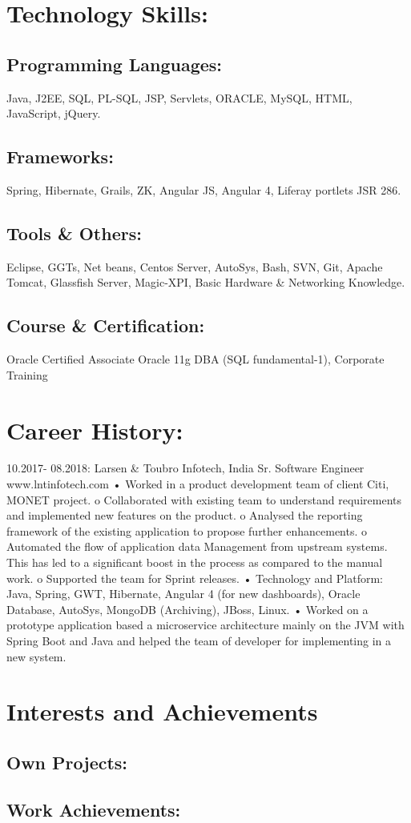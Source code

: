 \documentclass{article}
\begin{document}
\section{Technology Skills:}
\subsection{Programming Languages:}
Java, J2EE, SQL, PL-SQL, JSP, Servlets, ORACLE, MySQL, HTML, JavaScript, jQuery.
\subsection{Frameworks:}
 Spring, Hibernate, Grails, ZK, Angular JS, Angular 4, Liferay portlets JSR 286.
\subsection{Tools \& Others:} Eclipse, GGTs, Net beans, Centos Server, AutoSys, Bash, SVN, Git, Apache Tomcat, Glassfish Server, Magic-XPI, Basic Hardware \& Networking Knowledge.
\subsection{Course \& Certification:}
Oracle Certified Associate Oracle 11g DBA (SQL fundamental-1), Corporate Training

\section{Career History:}
10.2017- 08.2018: Larsen \& Toubro Infotech, India
Sr. Software Engineer www.lntinfotech.com
• Worked in a product development team of client Citi, MONET project.
o Collaborated with existing team to understand requirements and implemented new features on the product.
o Analysed the reporting framework of the existing application to propose further enhancements.
o Automated the flow of application data Management from upstream systems. This has led to a significant boost in the process as compared to the manual work.
o Supported the team for Sprint releases.
• Technology and Platform: Java, Spring, GWT, Hibernate, Angular 4 (for new dashboards), Oracle Database, AutoSys, MongoDB (Archiving), JBoss, Linux.
• Worked on a prototype application based a microservice architecture mainly on the JVM with Spring Boot and Java and helped the team of developer for implementing in a new system.

\section{Interests and Achievements}
\subsection{Own Projects:}
\subsection{Work Achievements:}
\end{document}
